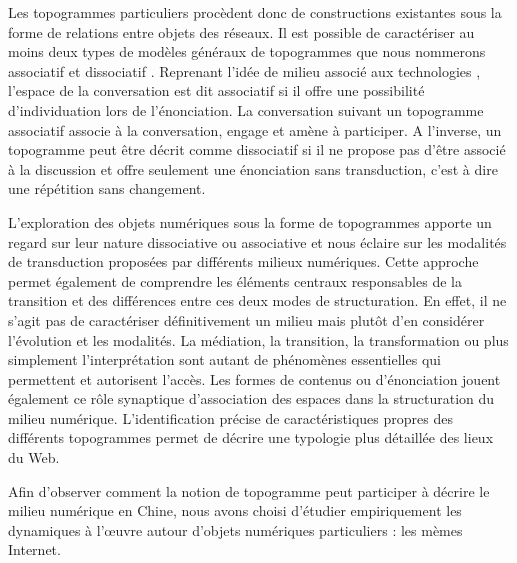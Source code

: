 Les topogrammes particuliers procèdent donc de constructions existantes sous la forme de relations entre objets des réseaux. Il est possible de caractériser au moins deux types de modèles généraux de topogrammes que nous nommerons associatif et dissociatif \citep{Stiegler2008}. Reprenant l’idée de milieu associé aux technologies \citep{Simondon1989}, l’espace de la conversation est dit associatif si il offre une possibilité d’individuation lors de l’énonciation. La conversation suivant un topogramme associatif associe à la conversation, engage et amène à participer. A l’inverse, un topogramme peut être décrit comme dissociatif si il ne propose pas d’être associé à la discussion et offre seulement une énonciation sans transduction, c’est à dire une répétition sans changement.

L’exploration des objets numériques sous la forme de topogrammes apporte un regard sur leur nature dissociative ou associative et nous éclaire sur les modalités de transduction proposées par différents milieux numériques. Cette approche permet également de comprendre les éléments centraux responsables de la transition et des différences entre ces deux modes de structuration. En effet, il ne s’agit pas de caractériser définitivement un milieu mais plutôt d’en considérer l’évolution et les modalités. La médiation, la transition, la transformation ou plus simplement l’interprétation sont autant de phénomènes essentielles qui permettent et autorisent l’accès. Les formes de contenus ou d’énonciation jouent également ce rôle synaptique d’association des espaces dans la structuration du milieu numérique. L’identification précise de caractéristiques propres des différents topogrammes permet de décrire une typologie plus détaillée des lieux du Web. 

Afin d’observer comment la notion de topogramme peut participer à décrire le milieu numérique en Chine, nous avons choisi d’étudier empiriquement les dynamiques à l’œuvre autour d'objets numériques particuliers : les mèmes Internet. 
